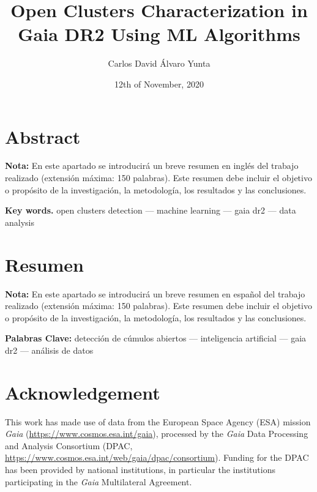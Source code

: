 \documentclass[11pt, a4paper, english]{book}
\title{Open Clusters Characterization in Gaia DR2 Using ML Algorithms}
\author{Carlos David Álvaro Yunta}
\date{12th of November, 2020}
\begin{document}

\maketitle

\frontmatter
\tableofcontents

\chapter{Abstract}

{\bf Nota:} En este apartado se introducirá un breve resumen en inglés del trabajo realizado (extensión máxima: 150 palabras).
Este resumen debe incluir el objetivo o propósito de la investigación, la metodología, los resultados y las conclusiones.

\medskip

{\bf Key words.} open clusters detection --- machine learning --- gaia dr2 --- data analysis

\chapter{Resumen}

{\bf Nota:} En este apartado se introducirá un breve resumen en español del trabajo realizado (extensión máxima: 150 palabras).
Este resumen debe incluir el objetivo o propósito de la investigación, la metodología, los resultados y las conclusiones.

\medskip

{\bf Palabras Clave:} detección de cúmulos abiertos --- inteligencia artificial --- gaia dr2 --- análisis de datos

\chapter{Acknowledgement}

This work has made use of data from the European Space Agency (ESA) mission
{\it Gaia} (\url{https://www.cosmos.esa.int/gaia}), processed by the {\it Gaia}
Data Processing and Analysis Consortium (DPAC,
\url{https://www.cosmos.esa.int/web/gaia/dpac/consortium}). Funding for the DPAC
has been provided by national institutions, in particular the institutions
participating in the {\it Gaia} Multilateral Agreement.
\end{document}
